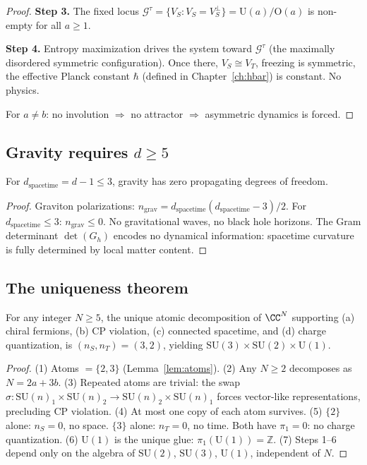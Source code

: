 \begin{remark}
\begin{proof}
\textbf{Step 3.}
The fixed locus $\mathcal{G}^\tau = \{V_S : V_S = V_S^\perp\} = \text{U}(a)/\text{O}(a)$ is non-empty for all $a \geq 1$.

\textbf{Step 4.}
Entropy maximization drives the system toward $\mathcal{G}^\tau$ (the maximally disordered symmetric configuration). Once there, $V_S \cong V_T$, freezing is symmetric, the effective Planck constant $\hbar$ (defined in Chapter~\ref{ch:hbar}) is constant. No physics.

For $a \neq b$: no involution $\Rightarrow$ no attractor $\Rightarrow$ asymmetric dynamics is forced.
\end{proof}

\subsection{Gravity requires $d \geq 5$}

\begin{proposition}
For $d_\text{spacetime} = d - 1 \leq 3$, gravity has zero propagating degrees of freedom.
\end{proposition}

\begin{proof}
Graviton polarizations: $n_\text{grav} = d_\text{spacetime}(d_\text{spacetime} - 3)/2$. For $d_\text{spacetime} \leq 3$: $n_\text{grav} \leq 0$. No gravitational waves, no black hole horizons. The Gram determinant $\det(G_h)$ encodes no dynamical information: spacetime curvature is fully determined by local matter content.
\end{proof}

\subsection{The uniqueness theorem}

\begin{theorem}
\label{thm:d5}
For any integer $N \geq 5$, the unique atomic decomposition of $\CC^N$ supporting (a) chiral fermions, (b) CP violation, (c) connected spacetime, and (d) charge quantization, is $(n_S, n_T) = (3, 2)$, yielding $\text{SU}(3) \times \text{SU}(2) \times \text{U}(1)$.
\end{theorem}

\begin{proof}
(1) Atoms $= \{2, 3\}$ (Lemma~\ref{lem:atoms}). (2) Any $N \geq 2$ decomposes as $N = 2a + 3b$. (3) Repeated atoms are trivial: the swap $\sigma: \text{SU}(n)_1 \times \text{SU}(n)_2 \to \text{SU}(n)_2 \times \text{SU}(n)_1$ forces vector-like representations, precluding CP violation. (4) At most one copy of each atom survives. (5) $\{2\}$ alone: $n_S = 0$, no space. $\{3\}$ alone: $n_T = 0$, no time. Both have $\pi_1 = 0$: no charge quantization. (6) $\text{U}(1)$ is the unique glue: $\pi_1(\text{U}(1)) = \mathbb{Z}$. (7) Steps 1--6 depend only on the algebra of $\text{SU}(2)$, $\text{SU}(3)$, $\text{U}(1)$, independent of $N$.
\end{proof}


\end{remark}
